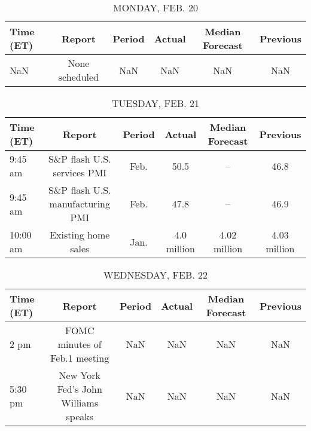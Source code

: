 \documentclass{article}%
\begin{document}
%
\normalsize%


\begin{table}[htbp]%
\caption{MONDAY, FEB. 20}%
\centering%
\begin{adjustbox}{width=1\textwidth}%
\begin{tabular}{lccccc}
\toprule
Time (ET) &         Report & Period & Actual & Median Forecast & Previous \\
\midrule
      NaN & None scheduled &    NaN &    NaN &             NaN &      NaN \\
\bottomrule
\end{tabular}
%
\end{adjustbox}%
\end{table}

%


\begin{table}[htbp]%
\caption{TUESDAY, FEB. 21}%
\centering%
\begin{adjustbox}{width=1\textwidth}%
\begin{tabular}{lccccc}
\toprule
Time (ET) &                           Report & Period &      Actual & Median Forecast &     Previous \\
\midrule
  9:45 am &      S\&P flash U.S. services PMI &   Feb. &        50.5 &              -- &         46.8 \\
  9:45 am & S\&P flash U.S. manufacturing PMI &   Feb. &        47.8 &              -- &         46.9 \\
 10:00 am &              Existing home sales &   Jan. & 4.0 million &    4.02 million & 4.03 million \\
\bottomrule
\end{tabular}
%
\end{adjustbox}%
\end{table}

%


\begin{table}[htbp]%
\caption{WEDNESDAY, FEB. 22}%
\centering%
\begin{adjustbox}{width=1\textwidth}%
\begin{tabular}{lccccc}
\toprule
Time (ET) &                              Report & Period & Actual & Median Forecast & Previous \\
\midrule
     2 pm &       FOMC minutes of Feb.1 meeting &    NaN &    NaN &             NaN &      NaN \\
  5:30 pm & New York Fed's John Williams speaks &    NaN &    NaN &             NaN &      NaN \\
\bottomrule
\end{tabular}
%
\end{adjustbox}%
\end{table}
\end{document}
